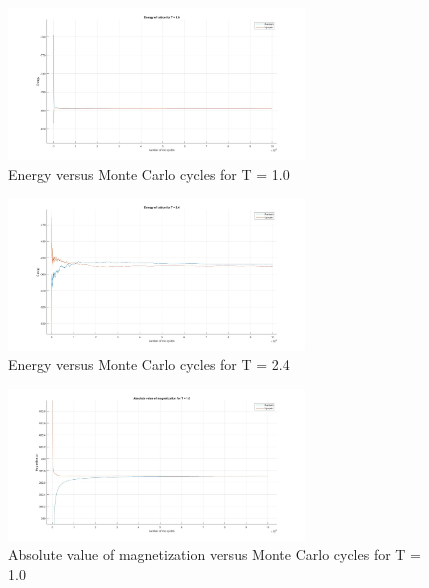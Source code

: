 \documentclass[10pt,a4paper]{article}
\begin{document}
\begin{figure}[H]
\centerline{
\includegraphics[width=0.7\textwidth]{energy1T}
}
\caption{Energy versus Monte Carlo cycles for T = 1.0}
\label{fig:energy1T}
\end{figure}

\begin{figure}[H]
\centerline{
\includegraphics[width=0.7\textwidth]{energy24T}
}
\caption{Energy versus Monte Carlo cycles for T = 2.4}
\label{fig:energy24T}
\end{figure}

\begin{figure}[H]
\centerline{
\includegraphics[width=0.7\textwidth]{absmag1T}
}
\caption{Absolute value of magnetization versus Monte Carlo cycles for T = 1.0}
\label{fig:absmag1T}
\end{figure}
\end{document}
